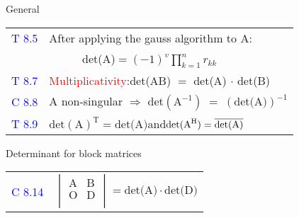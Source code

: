 \begin{mainbox}{General}
\begin{tabular}{rrl}
	\rule{0pt}{3ex}
	\textcolor{blue}{T 8.5} & \multicolumn{2}{l}{After applying the gauss algorithm to A:}\\
	\multicolumn{3}{c}{det(A)$=(-1)^v\displaystyle\prod_{k=1}^n r_{kk}$}\\
	\rule{0pt}{3ex}
	\textcolor{blue}{T 8.7} & \multicolumn{2}{l}{\textcolor{red}{Multiplicativity}:\quad det(AB) $=$ det(A) $\cdot$ det(B)}\\
	\rule{0pt}{3ex}
	\textcolor{blue}{C 8.8} & \multicolumn{2}{l}{A non-singular $\Rightarrow$ det$(\text{A}^{-1})\;=\;(\text{det(A)})^{-1}$}\\
	\rule{0pt}{3ex}
	\textcolor{blue}{T 8.9} & \multicolumn{2}{l}{$\text{det}(\text{A})^\text{T} = \text{det(A)}$\quad and\quad$\text{det}(\text{A}^\text{H}) = \overline{\text{det(A)}}$}\\
\end{tabular}
\end{mainbox}

\begin{bspbox}{Determinant for block matrices}
\setlength{\tabcolsep}{2pt}
\begin{tabular}{rl}
	\textcolor{blue}{C 8.14} & $\begin{vmatrix}
		\text{A} & \text{B} \\
		\text{O} & \text{D} \\
	\end{vmatrix} = \text{det(A)}\cdot\text{det(D)}$\\
\end{tabular}
\end{bspbox}